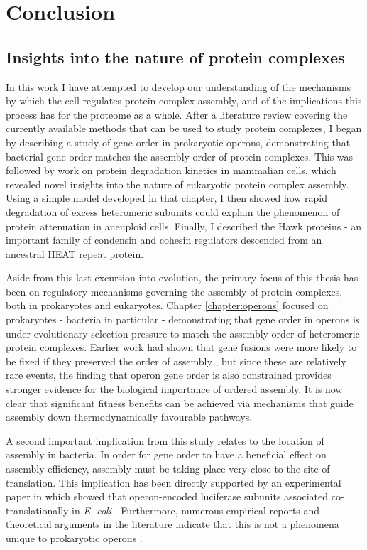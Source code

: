 \documentclass[a4paper,11pt,twoside,openright]{scrbook}
\begin{document}
\chapter{Conclusion}\label{chapter:conclusion}
\section{Insights into the nature of protein complexes}
In this work I have attempted to develop our understanding of the mechanisms by which the cell regulates protein complex assembly, and of the implications this process has for the proteome as a whole. After a literature review covering the currently available methods that can be used to study protein complexes, I began by describing a study of gene order in prokaryotic operons, demonstrating that bacterial gene order matches the assembly order of protein complexes. This was followed by work on protein degradation kinetics in mammalian cells, which revealed novel insights into the nature of eukaryotic protein complex assembly. Using a simple model developed in that chapter, I then showed how rapid degradation of excess heteromeric subunits could explain the phenomenon of protein attenuation in aneuploid cells. Finally, I described the Hawk proteins - an important family of condensin and cohesin regulators descended from an ancestral HEAT repeat protein.

Aside from this last excursion into evolution, the primary focus of this thesis has been on regulatory mechanisms governing the assembly of protein complexes, both in prokaryotes and eukaryotes. Chapter \ref{chapter:operons} focused on prokaryotes - bacteria in particular - demonstrating that gene order in operons is under evolutionary selection pressure to match the assembly order of heteromeric protein complexes. Earlier work had shown that gene fusions were more likely to be fixed if they preserved the order of assembly \cite{Marsh2013}, but since these are relatively rare events, the finding that operon gene order is also constrained provides stronger evidence for the biological importance of ordered assembly. It is now clear that significant fitness benefits can be achieved via mechanisms that guide assembly down thermodynamically favourable pathways.

A second important implication from this study relates to the location of assembly in bacteria. In order for gene order to have a beneficial effect on assembly efficiency, assembly must be taking place very close to the site of translation. This implication has been directly supported by an experimental paper in which showed that operon-encoded luciferase subunits associated co-translationally in \textit{E. coli} \cite{Shieh2015a}. Furthermore, numerous empirical reports and theoretical arguments in the literature indicate that this is not a phenomena unique to prokaryotic operons \cite{Wells2015,Natan2017}.
\end{document}
